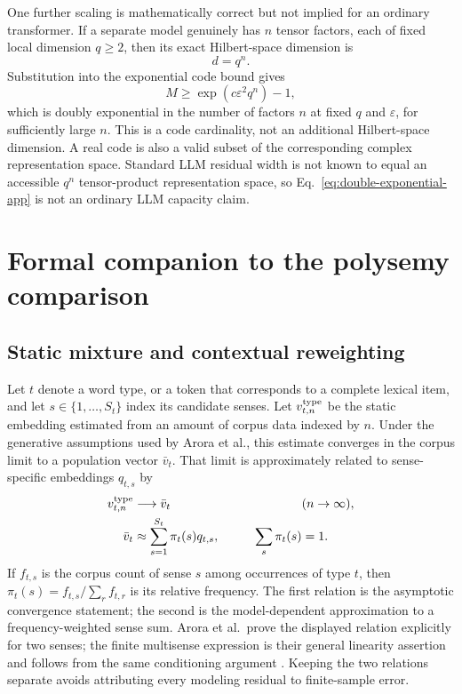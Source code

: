 \documentclass[
  aps,
  reprint,
  superscriptaddress,
  floatfix,
  nofootinbib,
  longbibliography
]{revtex4-2}
\begin{document}
One further scaling is mathematically correct but not implied for an ordinary
transformer.  If a separate model genuinely has $n$ tensor factors, each of
fixed local dimension $q\geq2$, then its exact Hilbert-space dimension is
\begin{equation}
 d=q^n.
 \label{eq:tensor-dimension-app}
\end{equation}
Substitution into the exponential code bound gives
\begin{equation}
 M\geq\exp(c\varepsilon^2q^n)-1,
 \label{eq:double-exponential-app}
\end{equation}
which is doubly exponential in the number of factors $n$ at fixed $q$ and
$\varepsilon$, for sufficiently large $n$.  This is a code cardinality, not
an additional Hilbert-space dimension.  A real code is also a valid subset of
the corresponding complex representation space.  Standard LLM residual width
is not known to equal an accessible $q^n$ tensor-product representation space, so
Eq.~\eqref{eq:double-exponential-app} is not an ordinary LLM capacity claim.

\section{Formal companion to the polysemy comparison}
\label{app:polysemy}

\subsection{Static mixture and contextual reweighting}

Let $t$ denote a word type, or a token that corresponds to a complete lexical
item, and let $s\in\{1,\ldots,S_t\}$ index its candidate senses.  Let
$v_{t,n}^{\rm type}$ be the static embedding estimated from an amount of corpus
data indexed by $n$.  Under the generative assumptions used by Arora et al.,
this estimate converges in the corpus limit to a population vector $\bar v_t$.
That limit is approximately related to sense-specific embeddings
$q_{t,s}$ by
\begin{equation}
\begin{aligned}
 v_{t,n}^{\rm type}&\longrightarrow\bar v_t &&(n\to\infty),\\
 \bar v_t&\approx\sum_{s=1}^{S_t}\pi_t(s)q_{t,s},
 &\qquad \sum_s\pi_t(s)&=1.
\end{aligned}
 \label{eq:arora-app}
\end{equation}
If $f_{t,s}$ is the corpus count of sense $s$ among occurrences of type $t$,
then $\pi_t(s)=f_{t,s}/\sum_r f_{t,r}$ is its relative frequency.  The first
relation is the asymptotic convergence statement; the second is the
model-dependent approximation to a frequency-weighted sense sum.  Arora et
al.\ prove the displayed relation explicitly for two senses; the finite
multisense expression is their general linearity assertion and follows from
the same conditioning argument \cite{arora-etal-2018-linear}.  Keeping the two
relations separate avoids attributing every modeling residual to finite-sample
error.
\end{document}
